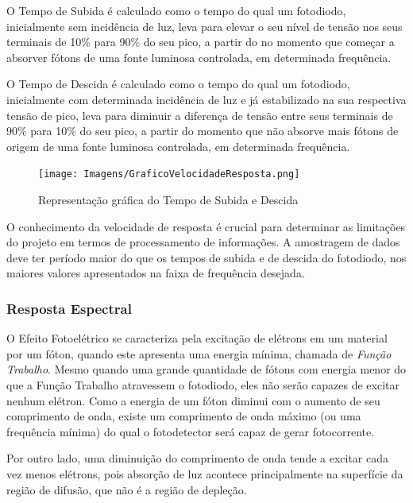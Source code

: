 O Tempo de Subida \'e calculado como o tempo do qual um fotodiodo, inicialmente sem incidência de luz, leva para elevar o seu nível de tensão nos seus terminais de 10\% para 90\% do seu pico, a partir do no momento que começar a absorver fótons de uma fonte luminosa controlada, em determinada frequência.

O Tempo de Descida \'e calculado como o tempo do qual um fotodiodo, inicialmente com determinada incidência de luz e já estabilizado na sua respectiva tensão de pico, leva para diminuir a diferença de tensão entre seus terminais de 90\% para 10\% do seu pico, a partir do momento que não absorve mais fótons de origem de uma fonte luminosa controlada, em determinada frequência.

\begin{figure}[!h]
	\caption{\label{fig_velocidadeResp}Representação gr\'afica do Tempo de Subida e Descida}
	\begin{center}
	    \texttt{[image: Imagens/GraficoVelocidadeResposta.png]}
	\end{center}
\end{figure}

O conhecimento da velocidade de resposta \'e crucial para determinar as limitações do projeto em termos de processamento de informações. A amostragem de dados deve ter período maior do que os tempos de subida e de descida do fotodiodo, nos maiores valores apresentados na faixa de frequência desejada.

\subsubsection{Resposta Espectral}

O Efeito Fotoel\'etrico se caracteriza pela excitação de el\'etrons em um material por um fóton, quando este apresenta uma energia mínima, chamada de \textit{Função Trabalho}. Mesmo quando uma grande quantidade de fótons com energia menor do que a Função Trabalho atravessem o fotodiodo, eles não serão capazes de excitar nenhum el\'etron. Como a energia de um fóton diminui com o aumento de seu comprimento de onda, existe um comprimento de onda máximo (ou uma frequência mínima) do qual o fotodetector será capaz de gerar fotocorrente.

Por outro lado, uma diminuição do comprimento de onda tende a excitar cada vez menos el\'etrons, pois absorção de luz acontece principalmente na superfície da região de difusão, que não é a região de depleção.


